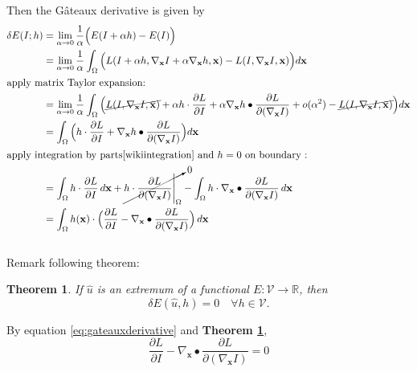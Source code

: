 \documentclass[paper=a4, fontsize=11pt]{scrartcl} %
\numberwithin{equation}{section} %
\numberwithin{figure}{section} %
\numberwithin{table}{section} %
\renewcommand{\vec}[1]{\mathbf{#1}}
\newtheorem{theorem}{Theorem}
\begin{document}
Then the G\^ateaux derivative is given by 
\begin{align}
	\delta E(I;h) &= \lim_{\alpha \to 0} \frac{1}{\alpha}\Big(E(I + \alpha h) - E(I)\Big) \\
	&= \lim_{\alpha \to 0} \frac{1}{\alpha} \int_\Omega \Big(L(I + \alpha h, \nabla_{\vec{x}} I + \alpha \nabla_{\vec{x}} h, \vec{x}) - L(I, \nabla_{\vec{x}} I, \vec{x}) \Big) d\vec{x} \\ 
	\shortintertext{apply matrix Taylor expansion:} 
	&= \lim_{\alpha \to 0} \frac{1}{\alpha} \int_\Omega \Big( \cancel{L(I, \nabla_{\vec{x}} I, \vec{x})} + \alpha h \cdot \frac{\partial L}{\partial I} + \alpha \nabla_{\vec{x}} h \bullet \frac{\partial L}{\partial (\nabla_{\vec{x}} I)} + o(\alpha^2) - \cancel{L(I, \nabla_{\vec{x}} I, \vec{x})} \Big) d\vec{x} \\
	&= \int_\Omega \Big( h \cdot \frac{\partial L}{\partial I} + \nabla_{\vec{x}} h \bullet \frac{\partial L}{\partial (\nabla_{\vec{x}} I)} \Big) d\vec{x} \\
	\shortintertext{apply integration by parts\cite{wikiintegration} and $h = 0$ on boundary :} 
	&= \int_\Omega h \cdot \frac{\partial L}{\partial I} \, d\vec{x} + \cancelto{0}{h \cdot \frac{\partial L}{\partial (\nabla_{\vec{x}} I)} \Bigg|_\Omega}  - \int_\Omega h \cdot \nabla_{\vec{x}} \bullet \frac{\partial L}{\partial (\nabla_{\vec{x}} I)} \, d\vec{x} \\
	&= \int_\Omega h(\vec{x}) \cdot \Big( \frac{\partial L}{\partial I} - \nabla_{\vec{x}} \bullet \frac{\partial L}{\partial (\nabla_{\vec{x}} I)} \Big) \, d\vec{x} \label{eq:gateauxderivative} 
\end{align} \\

Remark following theorem:

\begin{theorem} \label{thm:thm1}
	If $\hat{u}$ is an extremum of a functional $E : \mathcal{V} \rightarrow \mathbb{R}$, then \\
	\begin{equation*}
		\delta E(\hat{u}, h) = 0 \quad \forall h \in \mathcal{V}.
	\end{equation*} 
\end{theorem}

By equation \ref{eq:gateauxderivative} and \textbf{Theorem \ref{thm:thm1}}, 
\begin{equation} \label{eq:eulereq}
	\frac{\partial L}{\partial I} - \nabla_{\vec{x}} \bullet \frac{\partial L}{\partial (\nabla_{\vec{x}} I)} = 0	
\end{equation}
\end{document}
